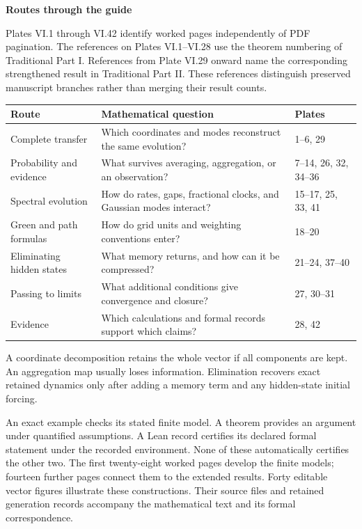 
{\sffamily\bfseries\Large\color{accent}Routes through the guide\par}\vspace{12pt}
Plates VI.1 through VI.42 identify worked pages independently of PDF pagination. The references on Plates VI.1--VI.28 use the theorem numbering of Traditional Part I. References from Plate VI.29 onward name the corresponding strengthened result in Traditional Part II. These references distinguish preserved manuscript branches rather than merging their result counts.
\begin{center}\small
\begin{tabularx}{\linewidth}{@{}p{1.6in}Yl@{}}\toprule
Route & Mathematical question & Plates\\\midrule
Complete transfer & Which coordinates and modes reconstruct the same evolution? & 1--6, 29\\
Probability and evidence & What survives averaging, aggregation, or an observation? & 7--14, 26, 32, 34--36\\
Spectral evolution & How do rates, gaps, fractional clocks, and Gaussian modes interact? & 15--17, 25, 33, 41\\
Green and path formulas & How do grid units and weighting conventions enter? & 18--20\\
Eliminating hidden states & What memory returns, and how can it be compressed? & 21--24, 37--40\\
Passing to limits & What additional conditions give convergence and closure? & 27, 30--31\\
Evidence & Which calculations and formal records support which claims? & 28, 42\\\bottomrule
\end{tabularx}
\end{center}
A coordinate decomposition retains the whole vector if all components are kept. An aggregation map usually loses information. Elimination recovers exact retained dynamics only after adding a memory term and any hidden-state initial forcing.

An exact example checks its stated finite model. A theorem provides an argument under quantified assumptions. A Lean record certifies its declared formal statement under the recorded environment. None of these automatically certifies the other two.
The first twenty-eight worked pages develop the finite models; fourteen further pages connect them to the extended results. Forty editable vector figures illustrate these constructions. Their source files and retained generation records accompany the mathematical text and its formal correspondence.

